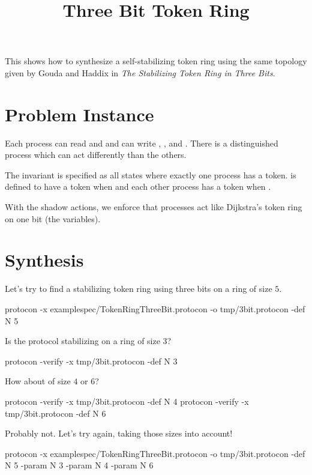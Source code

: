 
\title{Three Bit Token Ring}
\date{}



This shows how to synthesize a self-stabilizing token ring using the same topology given by 
Gouda and Haddix in \textit{The Stabilizing Token Ring in Three Bits}.

\section{Problem Instance}


Each process can read  and  and can write , , and .
There is a distinguished process  which can act differently than the others.

The invariant is specified as all states where exactly one process has a token.
 is defined to have a token when  and each other  process has a token when .

With the shadow actions, we enforce that processes act like Dijkstra's token ring on one bit (the  variables).

\section{Synthesis}

Let's try to find a stabilizing token ring using three bits on a ring of size $5$.
\begin{code}
protocon -x examplespec/TokenRingThreeBit.protocon -o tmp/3bit.protocon -def N 5
\end{code}

Is the protocol stabilizing on a ring of size $3$?
\begin{code}
protocon -verify -x tmp/3bit.protocon -def N 3
\end{code}

How about of size $4$ or $6$?
\begin{code}
protocon -verify -x tmp/3bit.protocon -def N 4
protocon -verify -x tmp/3bit.protocon -def N 6
\end{code}

Probably not.
Let's try again, taking those sizes into account!
\begin{code}
protocon -x examplespec/TokenRingThreeBit.protocon -o tmp/3bit.protocon -def N 5 -param N 3 -param N 4 -param N 6
\end{code}

